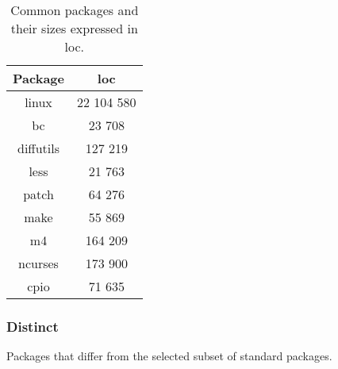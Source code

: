 \begin{table}[!h]
    \centering
    \begin{tabular}{|c||c|}
        \hline
        Package & \gls{loc} \\
        \hline
        \hline
        linux \cite{linux} & 22 104 580 \\
        \hline
        bc \cite{bc} & 23 708 \\
        \hline        
        diffutils \cite{diffutils} & 127 219 \\
        \hline
        less \cite{less} & 21 763 \\
        \hline
        patch \cite{patch} & 64 276 \\
        \hline
        make \cite{make} & 55 869 \\
        \hline
        m4 \cite{m4} & 164 209 \\
        \hline
        ncurses \cite{ncurses} & 173 900 \\
        \hline
        cpio \cite{cpio} & 71 635 \\
        \hline
    \end{tabular}
    \caption{Common packages and their sizes expressed in \gls{loc}.}
\end{table}

\newpage

\subsubsection{Distinct}

Packages that differ from the selected subset of standard packages.


